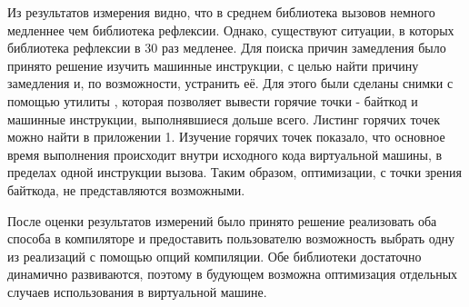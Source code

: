 Из результатов измерения видно, что в среднем библиотека вызовов немного медленнее чем библиотека рефлексии. Однако, существуют ситуации, в которых библиотека рефлексии в 30 раз медленее. Для поиска причин замедления было принято решение изучить машинные инструкции, с целью найти причину замедления и, по возможности, устранить её. Для этого были сделаны снимки с помощью утилиты , которая позволяет вывести горячие точки - байткод и машинные инструкции, выполнявшиеся дольше всего. Листинг горячих точек можно найти в приложении 1. Изучение горячих точек показало, что основное время выполнения происходит внутри исходного кода виртуальной машины, в пределах одной инструкции вызова. Таким образом, оптимизации, с точки зрения байткода, не представляются возможными.

После оценки результатов измерений было принято решение реализовать оба способа в компиляторе и предоставить пользователю возможность выбрать одну из реализаций с помощью опций компиляции. Обе библиотеки достаточно динамично развиваются, поэтому в будующем возможна оптимизация отдельных случаев использования в виртуальной машине.

